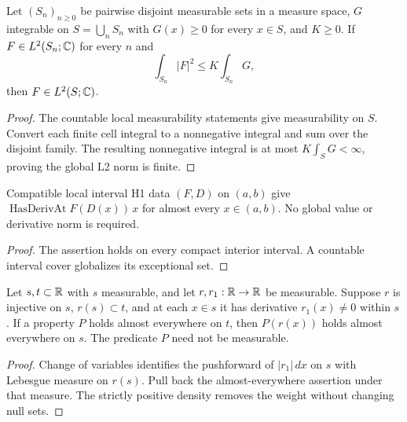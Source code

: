 \begin{lemma}
\label{lem:countable-cell-energy}
\leanok
Let $(S_n)_{n\ge0}$ be pairwise disjoint measurable sets in a measure
space, $G$ integrable on $S=\bigcup_nS_n$ with $G(x)\ge0$ for every
$x\in S$, and $K\ge0$. If $F\in L^2(S_n;\mathbb{C})$ for every $n$ and
\[
 \int_{S_n}|F|^2\le K\int_{S_n}G,
\]
then $F\in L^2(S;\mathbb{C})$.
\end{lemma}

\begin{proof}
\leanok
The countable local measurability statements give measurability on $S$.
Convert each finite cell integral to a nonnegative integral and sum over
the disjoint family. The resulting nonnegative integral is at most
$K\int_SG<\infty$, proving the global L2 norm is finite.
\end{proof}

\begin{lemma}
\label{lem:local-h1-classical-derivative}
\leanok
Compatible local interval H1 data $(F,D)$ on $(a,b)$ give
$\operatorname{HasDerivAt}F(D(x))\,x$ for almost every $x\in(a,b)$.
No global value or derivative norm is required.
\end{lemma}

\begin{proof}
\leanok
The assertion holds on every compact interior interval.
A countable interval cover globalizes its exceptional set.
\end{proof}

\begin{lemma}
\label{lem:nondegenerate-scalar-ae}
\leanok
Let $s,t\subset\mathbb{R}$ with $s$ measurable, and let $r,r_1:\mathbb{R}\to\mathbb{R}$
be measurable. Suppose $r$ is injective on $s$, $r(s)\subset t$, and at
each $x\in s$ it has derivative $r_1(x)\ne0$ within $s$.
If a property $P$ holds almost everywhere on $t$, then $P(r(x))$ holds
almost everywhere on $s$. The predicate $P$ need not be measurable.
\end{lemma}

\begin{proof}
\leanok
Change of variables identifies the pushforward of
$|r_1|\,dx$ on $s$ with Lebesgue measure on $r(s)$.
Pull back the almost-everywhere assertion under that measure.
The strictly positive density removes the weight without changing null sets.
\end{proof}

